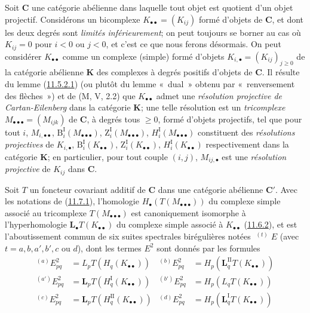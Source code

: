 \begin{env}[11.7.1]
\label{0.11.7.1-fr}
Soit $\boldsymbol{C}$ une catégorie abélienne dans laquelle tout objet est
quotient d'un objet projectif. Considérons un bicomplexe
$K_{\bullet\bullet}=(K_{ij})$ formé d'objets de $\boldsymbol{C}$, et dont les deux
degrés sont \emph{limités inférieurement}; on peut toujours se borner au cas où
$K_{ij}=0$ pour $i<0$ ou $j<0$, et c'est ce que nous ferons désormais. On
peut considérer $K_{\bullet\bullet}$ comme un complexe (simple) formé
d'objets $K_{i,\bullet}=(K_{ij})_{j\geq 0}$ de la catégorie abélienne
$\boldsymbol{K}$ des complexes à degrés positifs d'objets de $\boldsymbol{C}$. Il
résulte du lemme (\hyperref[0.11.5.2.1-fr]{11.5.2.1}) (ou plutôt du lemme
«~dual~» obtenu par «~renversement des flèches~») et de (M, V, 2.2) que
$K_{\bullet\bullet}$ admet une \emph{résolution projective de
Cartan-Eilenberg} dans la catégorie $\boldsymbol{K}$; une telle résolution est un
\emph{tricomplexe} $M_{\bullet\bullet\bullet}=(M_{ijk})$ de $\boldsymbol{C}$, à degrés
tous $\geq 0$, formé d'objets projectifs, tel que pour tout $i$,
$M_{i,\bullet\bullet}$, $\mathrm B_i^{\mathrm I}(M_{\bullet\bullet\bullet})$,
$\mathrm Z_i^{\mathrm I}(M_{\bullet\bullet\bullet})$,
$H_i^{\mathrm I}(M_{\bullet\bullet\bullet})$ constituent des \emph{résolutions
projectives} de $K_{i,\bullet}$,
$\mathrm B_i^{\mathrm I}(K_{\bullet\bullet})$,
$\mathrm Z_i^{\mathrm I}(K_{\bullet\bullet})$,
$H_i^{\mathrm I}(K_{\bullet\bullet})$ respectivement dans la catégorie
$\boldsymbol{K}$; en particulier, pour tout couple $(i,j)$,
$M_{ij,\bullet}$ est une \emph{résolution projective} de $K_{ij}$ dans
$\boldsymbol{C}$.
\end{env}

\begin{proposition}[11.7.2]
\label{0.11.7.2-fr}
Soit $T$ un foncteur covariant additif de $\boldsymbol{C}$ dans une catégorie
abélienne $\boldsymbol{C}'$. Avec les notations de
\textup{(\hyperref[0.11.7.1-fr]{11.7.1})}, {l'homologie
$H_\bullet(T(M_{\bullet\bullet\bullet}))$ du complexe simple associé au
tricomplexe $T(M_{\bullet\bullet\bullet})$ est canoniquement isomorphe à
l'hyperhomologie $\mathbf{L}_\bullet T(K_{\bullet\bullet})$ du complexe
simple associé à $K_{\bullet\bullet}$
\textup{(\hyperref[0.11.6.2-fr]{11.6.2})}, et est
l'aboutissement commun de six suites spectrales birégulières notées
$\mathop{}^{(t)}E$ (avec $t=a,b,a',b',c$ ou $d$), dont les termes $E^2$ sont
donnés par les formules}
\[
\begin{aligned}
{}^{(a)}E^2_{pq}&=L_pT(H_q(K_{\bullet\bullet}))&
{}^{(b)}E^2_{pq}&=H_p(\mathbf{L}_q^{\mathrm{II}}T(K_{\bullet\bullet}))\\
{}^{(a')}E^2_{pq}&=\mathbf{L}_pT(H_q^{\mathrm I}(K_{\bullet\bullet}))&
{}^{(b')}E^2_{pq}&=H_p(L_qT(K_{\bullet\bullet}))\\
{}^{(c)}E^2_{pq}&=\mathbf{L}_pT(H_q^{\mathrm{II}}(K_{\bullet\bullet}))&
{}^{(d)}E^2_{pq}&=H_p(\mathbf{L}_q^{\mathrm I}T(K_{\bullet\bullet}))
\end{aligned}
\]
\end{proposition}

